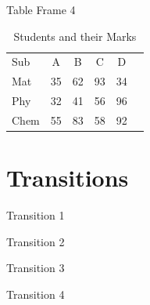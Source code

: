 \documentclass{beamer}
\begin{document}
\begin{frame}{Table Frame 4}
\begin{table}[]
\centering
\caption{Students and their Marks}
\begin{tabular}{lc<{\onslide<2->}c<{\onslide<3->}c<{\onslide<4->}c<{\onslide}c}
Sub & A & B & C & D \\
  Mat     & 35 & 62 & 93 & 34 \\
  Phy     & 32 & 41 & 56 & 96 \\
  Chem    &55&83&58&92
\end{tabular}
\end{table}
\end{frame}

\section{Transitions}

\begin{frame}{Transition 1}
\lipsum[1-1]
\end{frame}
\begin{frame}{Transition 2}
\lipsum[2-2]
\end{frame}
\begin{frame}{Transition 3}
\lipsum[3-3]
\end{frame}
\begin{frame}{Transition 4}
\lipsum[4-4]
\end{frame}
\end{document}
